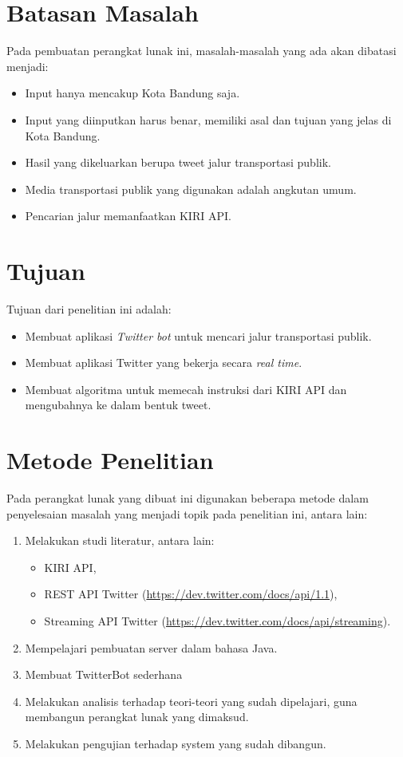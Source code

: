 \section{Batasan Masalah}
Pada pembuatan perangkat lunak ini, masalah-masalah yang ada akan dibatasi menjadi:
\begin{itemize}
	\item Input hanya mencakup Kota Bandung saja.
	\item Input yang diinputkan harus benar, memiliki asal dan tujuan yang jelas di Kota Bandung.
	\item Hasil yang dikeluarkan berupa tweet jalur transportasi publik.
	\item Media transportasi publik yang digunakan adalah angkutan umum.
	\item Pencarian jalur memanfaatkan KIRI API.
\end{itemize}

\section{Tujuan}
Tujuan dari penelitian ini adalah:
\begin{itemize}
	\item Membuat aplikasi \textit{Twitter bot} untuk mencari jalur transportasi publik.
	\item Membuat aplikasi Twitter yang bekerja secara \textit{real time}.
	\item Membuat algoritma untuk memecah instruksi dari KIRI API dan mengubahnya ke dalam bentuk tweet.
\end{itemize}

\section{Metode Penelitian}
Pada perangkat lunak yang dibuat ini digunakan beberapa metode dalam penyelesaian masalah yang menjadi topik pada penelitian ini, antara lain:
\begin{enumerate}
	\item Melakukan studi literatur, antara lain:
	\begin{itemize}
		\item KIRI API,
		\item REST API Twitter (\url{https://dev.twitter.com/docs/api/1.1}),
		\item Streaming API Twitter (\url{https://dev.twitter.com/docs/api/streaming}).
	\end{itemize}
	\item Mempelajari pembuatan server dalam bahasa Java.
	\item Membuat TwitterBot sederhana
	\item Melakukan analisis terhadap teori-teori yang sudah dipelajari, guna membangun perangkat lunak yang dimaksud.
	\item Melakukan pengujian terhadap system yang sudah dibangun.
\end{enumerate}
